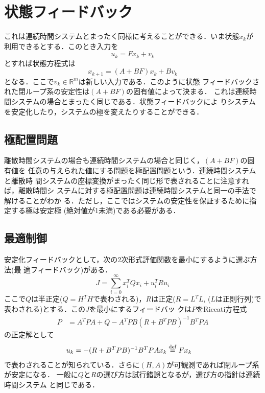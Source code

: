 \section{状態フィードバック}
これは連続時間システムとまったく同様に考えることができる．いま状態$x_k$が
利用できるとする．このとき入力を
\begin{equation}
 u_k = F x_k + v_k
\end{equation}
とすれば状態方程式は
\begin{equation}
 x_{k+1} = (A + B F)x_k + B v_k
\end{equation}
となる．ここで$v_k \in \mathbb{R}^m $は新しい入力である．このように状態
フィードバックされた閉ループ系の安定性は$(A + BF)$の固有値によって決まる．
これは連続時間システムの場合とまったく同じである．状態フィードバックによ
りシステムを安定化したり，システムの極を変えたりすることができる．
\subsection{極配置問題}
離散時間システムの場合も連続時間システムの場合と同じく，$(A+BF)$の固有値を
任意の与えられた値にする問題を極配置問題という．連続時間システムと離散時
間システムの座標変換がまったく同じ形で表されることに注意すれば，離散時間シ
ステムに対する極配置問題は連続時間システムと同一の手法で解けることがわか
る．ただし，ここではシステムの安定性を保証するために指定する極は安定極
(絶対値が1未満)である必要がある．
\subsection{最適制御}
安定化フィードバックとして，次の2次形式評価関数を最小にするように選ぶ方法(最
適フィードバック)がある．
\begin{equation}
 J = \sum_{i=0}^{\infty} x_i^T Q x_i + u_i^T R u_i 
\end{equation}
ここで$Q$は半正定($Q = H^T H$で表わされる)，$R$は正定($R = L^T L$,
($L$は正則行列)で表わされる)とする．この$J$を最小にするフィードバッ
クは$P$をRiccati方程式
\begin{align}
 P   &= A^T P A + Q - A^T P B (R + B^T P B)^{-1} B^T P A
\end{align}
の正定解として
\begin{align}
 u_k &= - (R + B^T P B)^{-1} B^T P A x_k \stackrel{\rm def}{=} Fx_k
\end{align}
で表わされることが知られている．さらに$(H, A)$が可観測であれば閉ループ系
が安定になる．
一般に$Q$と$R$の選び方は試行錯誤となるが，選び方の指針は連続時間システム
と同じである．

